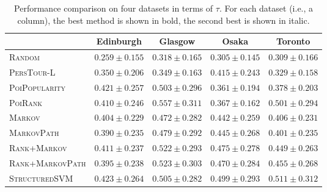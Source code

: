 \begin{table*}
\centering
\begin{tabular}{l|cccc} \hline
 & Edinburgh & Glasgow & Osaka & Toronto \\ \hline
\textsc{Random} & $0.259\pm0.155$ & $0.318\pm0.165$ & $0.305\pm0.145$ & $0.309\pm0.166$ \\
\textsc{PersTour-L} & $0.350\pm0.206$ & $0.349\pm0.163$ & $0.415\pm0.243$ & $0.329\pm0.158$ \\
\textsc{PoiPopularity} & $\mathit{0.421\pm0.257}$ & $0.503\pm0.296$ & $0.361\pm0.194$ & $0.378\pm0.203$ \\
\textsc{PoiRank} & $0.410\pm0.246$ & $\mathbf{0.557\pm0.311}$ & $0.367\pm0.162$ & $\mathit{0.501\pm0.294}$ \\
\textsc{Markov} & $0.404\pm0.229$ & $0.472\pm0.282$ & $0.442\pm0.259$ & $0.406\pm0.231$ \\
\textsc{MarkovPath} & $0.390\pm0.235$ & $0.479\pm0.292$ & $0.445\pm0.268$ & $0.401\pm0.235$ \\
\textsc{Rank+Markov} & $0.411\pm0.237$ & $0.522\pm0.293$ & $\mathit{0.475\pm0.278}$ & $0.449\pm0.263$ \\
\textsc{Rank+MarkovPath} & $0.395\pm0.238$ & $\mathit{0.523\pm0.303}$ & $0.470\pm0.284$ & $0.455\pm0.268$ \\
\textsc{StructuredSVM} & $\mathbf{0.423\pm0.264}$ & $0.505\pm0.282$ & $\mathbf{0.499\pm0.293}$ & $\mathbf{0.511\pm0.312}$ \\
\hline
\end{tabular}
\caption{Performance comparison on four datasets in terms of $\tau$.
         For each dataset (i.e., a column), the best method is shown in bold, the second best is shown in italic.}
\label{table:tau}
\end{table*}


